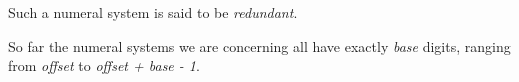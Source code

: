 \documentclass[12pt, a4paper]{article}
\begin{document}
Such a numeral system is said to be \textit{redundant}.

So far the numeral systems we are concerning all have exactly \textit{base} digits,
ranging from \textit{offset} to \textit{offset + base - 1}.




%








%
%

%
%


\end{document}
